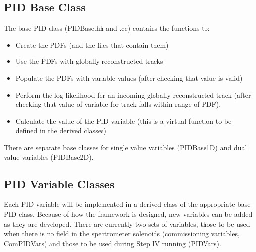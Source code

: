 \subsection{PID Base Class}
\label{PIDBase}
The base PID class (PIDBase.hh and .cc) contains the functions to:
\begin{itemize}
\item Create the PDFs (and the files that contain them)
\item Use the PDFs with globally reconstructed tracks
\item Populate the PDFs with variable values (after checking that 
value is valid)
\item Perform the log-likelihood for an incoming globally reconstructed 
track (after checking that value of variable for track falls within 
range of PDF).
\item Calculate the value of the PID variable (this is a virtual 
function to be defined in the derived classes)
\end{itemize}

There are separate base classes for single value variables (PIDBase1D) and dual value variables (PIDBase2D).

\subsection{PID Variable Classes}
\label{PIDVar}
Each PID variable will be implemented in a derived class of the appropriate base PID class. Because of how the framework is designed, new variables can be added as they are developed. There are currently two sets of variables, those to be used when there is no field in the spectrometer solenoids (commissioning variables, ComPIDVars) and those to be used during Step IV running (PIDVars). 

